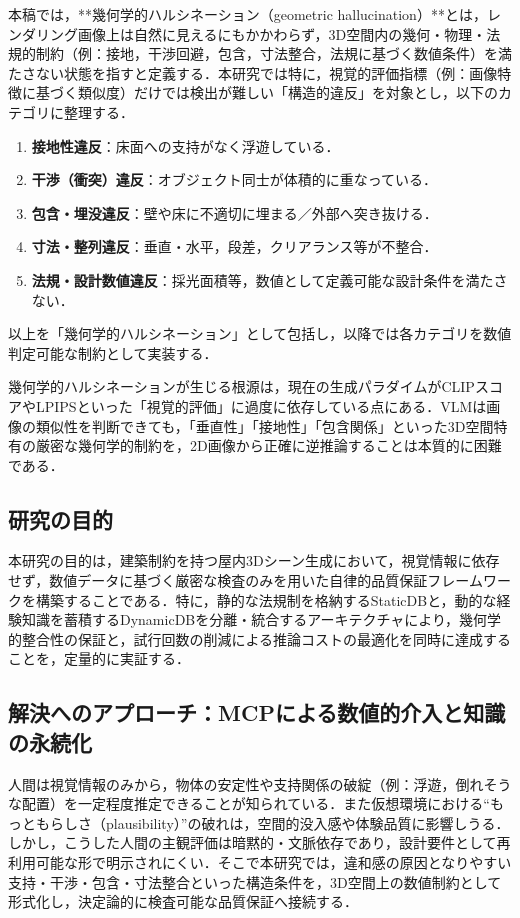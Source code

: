 \documentclass[dvipdfmx, a4paper, 9pt]{deimj}
\begin{document}
本稿では，**幾何学的ハルシネーション（geometric hallucination）**とは，レンダリング画像上は自然に見えるにもかかわらず，3D空間内の幾何・物理・法規的制約（例：接地，干渉回避，包含，寸法整合，法規に基づく数値条件）を満たさない状態を指すと定義する．本研究では特に，視覚的評価指標（例：画像特徴に基づく類似度）だけでは検出が難しい「構造的違反」を対象とし，以下のカテゴリに整理する．
\begin{enumerate}
    \item[(i)] \textbf{接地性違反}：床面への支持がなく浮遊している．
    \item[(ii)] \textbf{干渉（衝突）違反}：オブジェクト同士が体積的に重なっている．
    \item[(iii)] \textbf{包含・埋没違反}：壁や床に不適切に埋まる／外部へ突き抜ける．
    \item[(iv)] \textbf{寸法・整列違反}：垂直・水平，段差，クリアランス等が不整合．
    \item[(v)] \textbf{法規・設計数値違反}：採光面積等，数値として定義可能な設計条件を満たさない．
\end{enumerate}
以上を「幾何学的ハルシネーション」として包括し，以降では各カテゴリを数値判定可能な制約として実装する．

幾何学的ハルシネーションが生じる根源は，現在の生成パラダイムがCLIPスコア\cite{radford2021clip}やLPIPS\cite{zhang2018lpips}といった「視覚的評価」に過度に依存している点にある．VLMは画像の類似性を判断できても，「垂直性」「接地性」「包含関係」といった3D空間特有の厳密な幾何学的制約を，2D画像から正確に逆推論することは本質的に困難である．

\subsection{研究の目的}

本研究の目的は，建築制約を持つ屋内3Dシーン生成において，視覚情報に依存せず，数値データに基づく厳密な検査のみを用いた自律的品質保証フレームワークを構築することである．特に，静的な法規制を格納するStaticDBと，動的な経験知識を蓄積するDynamicDBを分離・統合するアーキテクチャにより，幾何学的整合性の保証と，試行回数の削減による推論コストの最適化を同時に達成することを，定量的に実証する．

\subsection{解決へのアプローチ：MCPによる数値的介入と知識の永続化}

人間は視覚情報のみから，物体の安定性や支持関係の破綻（例：浮遊，倒れそうな配置）を一定程度推定できることが知られている．また仮想環境における“もっともらしさ（plausibility）”の破れは，空間的没入感や体験品質に影響しうる．しかし，こうした人間の主観評価は暗黙的・文脈依存であり，設計要件として再利用可能な形で明示されにくい．そこで本研究では，違和感の原因となりやすい支持・干渉・包含・寸法整合といった構造条件を，3D空間上の数値制約として形式化し，決定論的に検査可能な品質保証へ接続する．
\end{document}
